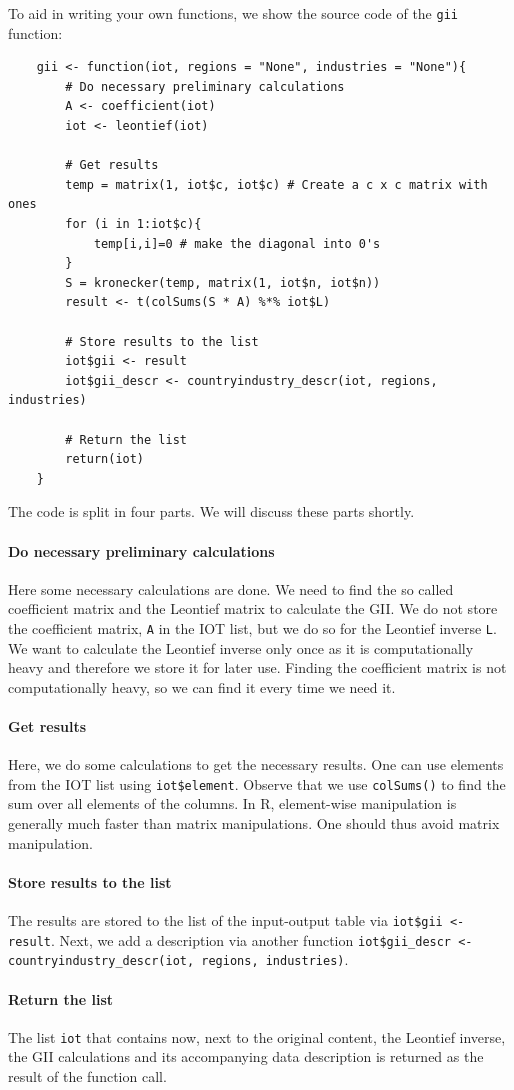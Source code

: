 \documentclass[10pt,a4paper]{paper}
\begin{document}
	To aid in writing your own functions, we show the source code of the \texttt{gii} function:
	\begin{Verbatim}
	gii <- function(iot, regions = "None", industries = "None"){
		# Do necessary preliminary calculations
		A <- coefficient(iot)
		iot <- leontief(iot)
	
		# Get results
		temp = matrix(1, iot$c, iot$c) # Create a c x c matrix with ones
		for (i in 1:iot$c){
			temp[i,i]=0 # make the diagonal into 0's
		}
		S = kronecker(temp, matrix(1, iot$n, iot$n)) 
		result <- t(colSums(S * A) %*% iot$L) 
		
		# Store results to the list
		iot$gii <- result	
		iot$gii_descr <- countryindustry_descr(iot, regions, industries)
		
		# Return the list
		return(iot)
	}	
	\end{Verbatim}
	The code is split in four parts. We will discuss these parts shortly.
	
	\paragraph{Do necessary preliminary calculations} Here some necessary calculations are done. We need to find the so called coefficient matrix and the Leontief matrix to calculate the GII. We do not store the coefficient matrix, \texttt{A} in the IOT list, but we do so for the Leontief inverse \texttt{L}. We want to calculate the Leontief inverse only once as it is computationally heavy and therefore we store it for later use. Finding the coefficient matrix is not computationally heavy, so we can find it every time we need it.
	
	\paragraph{Get results} Here, we do some calculations to get the necessary results. One can use elements from the IOT list using \texttt{iot\$element}. Observe that we use \texttt{colSums()} to find the sum over all elements of the columns. In R, element-wise manipulation is generally much faster than matrix manipulations. One should thus avoid matrix manipulation. 
	
	\paragraph{Store results to the list}
	The results are stored to the list of the input-output table via  \texttt{iot\$gii <- result}. Next, we add a description via another function \texttt{iot\$gii\_descr <- countryindustry\_descr(iot, regions, industries)}. 
	
	\paragraph{Return the list} The list \texttt{iot} that contains now, next to the original content, the Leontief inverse, the GII calculations and its accompanying data description is returned as the result of the function call.
	
\end{document}
